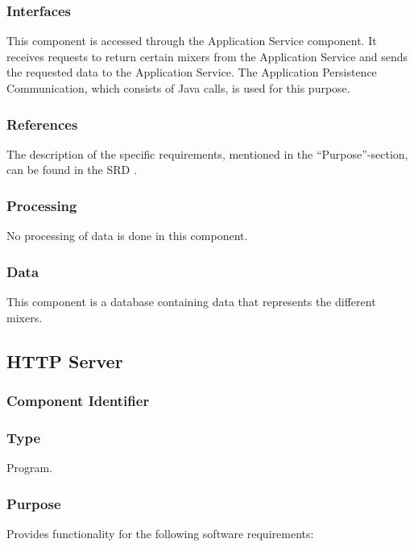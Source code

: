\subsubsection*{Interfaces}
This component is accessed through the Application Service component. It receives requests to return certain mixers from the Application Service and sends the requested data to the Application Service. The Application Persistence Communication, which consists of Java calls, is used for this purpose.

\subsubsection*{References}
The description of the specific requirements, mentioned in the ``Purpose''-section, can be found in the SRD \cite{srd}.

\subsubsection*{Processing}
No processing of data is done in this component.

\subsubsection*{Data}
This component is a database containing data that represents the different mixers.

\subsection{HTTP Server}
\label{subsec:httpserver}

\subsubsection*{Component Identifier}
\RTMSHS{}

\subsubsection*{Type}
Program.

\subsubsection*{Purpose}
Provides functionality for the following software requirements:

